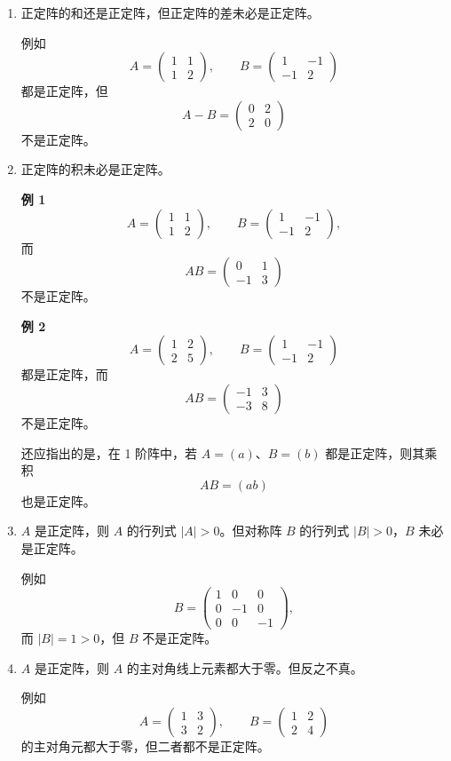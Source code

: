 \begin{enumerate}
\item 正定阵的和还是正定阵，但正定阵的差未必是正定阵。

例如
\[
 A=\begin{pmatrix}1&1\\1&2\end{pmatrix},\qquad
 B=\begin{pmatrix}1&-1\\-1&2\end{pmatrix}
\]
都是正定阵，但
\[
 A-B=\begin{pmatrix}0&2\\2&0\end{pmatrix}
\]
不是正定阵。

\item 正定阵的积未必是正定阵。

\textbf{例 1}
\[
 A=\begin{pmatrix}1&1\\1&2\end{pmatrix},\qquad
 B=\begin{pmatrix}1&-1\\-1&2\end{pmatrix},
\]
而
\[
 AB=\begin{pmatrix}0&1\\-1&3\end{pmatrix}
\]
不是正定阵。

\textbf{例 2}
\[
 A=\begin{pmatrix}1&2\\2&5\end{pmatrix},\qquad
 B=\begin{pmatrix}1&-1\\-1&2\end{pmatrix}
\]
都是正定阵，而
\[
 AB=\begin{pmatrix}-1&3\\-3&8\end{pmatrix}
\]
不是正定阵。

还应指出的是，在 1 阶阵中，若 $A=(a)$、$B=(b)$ 都是正定阵，则其乘积
\[
 AB=(ab)
\]
也是正定阵。

\item $A$ 是正定阵，则 $A$ 的行列式 $|A|>0$。但对称阵 $B$ 的行列式 $|B|>0$，$B$ 未必是正定阵。

例如
\[
 B=\begin{pmatrix}1&0&0\\0&-1&0\\0&0&-1\end{pmatrix},
\]
而 $|B|=1>0$，但 $B$ 不是正定阵。

\item $A$ 是正定阵，则 $A$ 的主对角线上元素都大于零。但反之不真。

例如
\[
 A=\begin{pmatrix}1&3\\3&2\end{pmatrix},\qquad
 B=\begin{pmatrix}1&2\\2&4\end{pmatrix}
\]
的主对角元都大于零，但二者都不是正定阵。
\end{enumerate}

